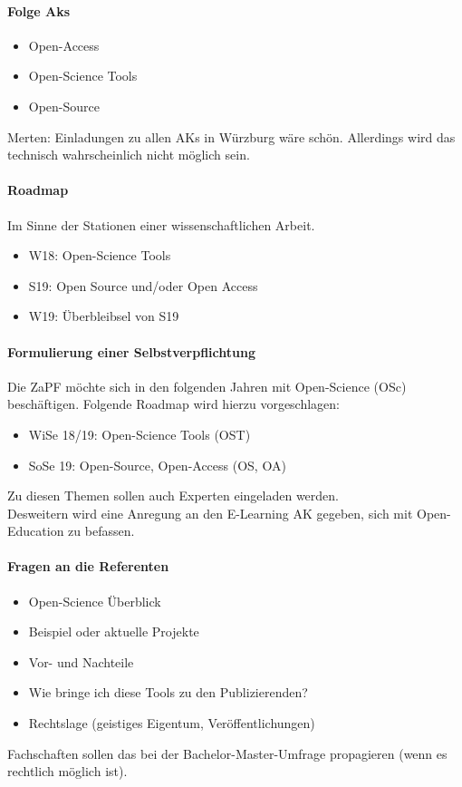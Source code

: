     \paragraph{Folge Aks}
      \begin{itemize}
        \item Open-Access
        \item Open-Science Tools
        \item Open-Source
      \end{itemize}
      Merten: Einladungen zu allen AKs in Würzburg wäre schön. Allerdings wird das technisch wahrscheinlich nicht möglich sein.

    \paragraph{Roadmap}
      Im Sinne der Stationen einer wissenschaftlichen Arbeit.\\
        \begin{itemize}
		\item W18: Open-Science Tools
		\item S19: Open Source und/oder Open Access
		\item W19: Überbleibsel von S19
	\end{itemize}

    \paragraph{Formulierung einer Selbstverpflichtung}
      Die ZaPF möchte sich in den folgenden Jahren mit Open-Science (OSc) beschäftigen. Folgende Roadmap wird hierzu vorgeschlagen:
      \begin{itemize}
        \item WiSe 18/19: Open-Science Tools (OST)
        \item SoSe 19: Open-Source, Open-Access (OS, OA)
      \end{itemize}
      Zu diesen Themen sollen auch Experten eingeladen werden. \\ Desweitern wird eine Anregung an den E-Learning AK gegeben, sich mit Open-Education zu befassen.

    \paragraph{Fragen an die Referenten}
      \begin{itemize}
        \item Open-Science Überblick
        \item Beispiel oder aktuelle Projekte
        \item Vor- und Nachteile
        \item Wie bringe ich diese Tools zu den Publizierenden?
        \item Rechtslage (geistiges Eigentum, Veröffentlichungen)
      \end{itemize}
      Fachschaften sollen das bei der Bachelor-Master-Umfrage propagieren (wenn es rechtlich möglich ist).

